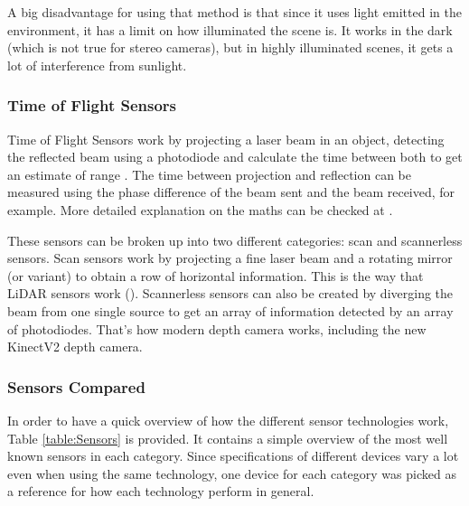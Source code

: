 \documentclass[11pt]{article}
\begin{document}
A big disadvantage for using that method is that since it uses light emitted in the environment, it has a limit on how illuminated the scene is. It works in the dark (which is not true for stereo cameras), but in highly illuminated scenes, it gets a lot of interference from sunlight.
	
	\subsubsection{Time of Flight Sensors}

Time of Flight Sensors work by projecting a laser beam in an object, detecting the reflected beam using a photodiode and calculate the time between both to get an estimate of range \cite{horaud2016overview}. The time between projection and reflection can be measured using the phase difference of the beam sent and the beam received, for example. More detailed explanation on the maths can be checked at \cite{horaud2016overview}.

These sensors can be broken up into two different categories: scan and scannerless sensors. Scan sensors work by projecting a fine laser beam and a rotating mirror (or variant) to obtain a row of horizontal information. This is the way that LiDAR sensors work (\cite{horaud2016overview}). Scannerless sensors can also be created by diverging the beam from one single source to get an array of information detected by an array of photodiodes. That's how modern depth camera works, including the new KinectV2 depth camera.

	\subsubsection{Sensors Compared}

In order to have a quick overview of how the different sensor technologies work, Table \ref{table:Sensors} is provided. It contains a simple overview of the most well known sensors in each category. Since specifications of different devices vary a lot even when using the same technology, one device for each category was picked as a reference for how each technology perform in general.
\end{document}
